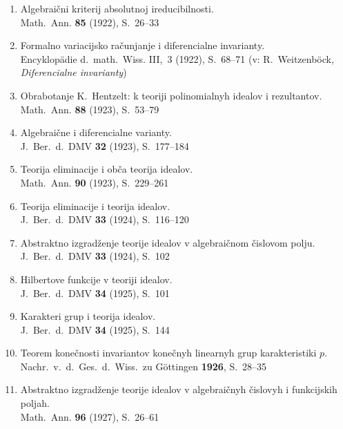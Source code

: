 \documentclass[11pt]{article}
\newcommand{\foreign}[1]{#1}
\begin{document}
\begin{enumerate}[label={\small\arabic*.},leftmargin=2em,itemsep=0.3em]
\item Algebraični kriterij absolutnoj ireducibilnosti.\\
\foreign{Math.\ Ann.} \textbf{85} (1922), S.~26--33

\item Formalno variacijsko računjanje i diferencialne invarianty.\\
\foreign{Encyklopädie d.\ math.\ Wiss.} III,\ 3 (1922), S.~68--71 (v:
R.\ Weitzenböck, \textit{Diferencialne invarianty})

\item Obrabotanje K.\ Hentzelt: k teoriji polinomialnyh idealov i rezultantov.\\
\foreign{Math.\ Ann.} \textbf{88} (1923), S.~53--79

\item Algebraične i diferencialne varianty.\\
\foreign{J.\ Ber.\ d.\ DMV} \textbf{32} (1923), S.~177--184

\item Teorija eliminacije i obča teorija idealov.\\
\foreign{Math.\ Ann.} \textbf{90} (1923), S.~229--261

\item Teorija eliminacije i teorija idealov.\\
\foreign{J.\ Ber.\ d.\ DMV} \textbf{33} (1924), S.~116--120

\item Abstraktno izgradženje teorije idealov v algebraičnom čislovom polju.\\
\foreign{J.\ Ber.\ d.\ DMV} \textbf{33} (1924), S.~102

\item Hilbertove funkcije v teoriji idealov.\\
\foreign{J.\ Ber.\ d.\ DMV} \textbf{34} (1925), S.~101

\item Karakteri grup i teorija idealov.\\
\foreign{J.\ Ber.\ d.\ DMV} \textbf{34} (1925), S.~144

\item Teorem konečnosti invariantov konečnyh linearnyh grup karakteristiki $p$.\\
\foreign{Nachr.\ v.\ d.\ Ges.\ d.\ Wiss.\ zu Göttingen} \textbf{1926}, S.~28--35

\item Abstraktno izgradženje teorije idealov v algebraičnyh čislovyh i funkcijskih poljah.\\
\foreign{Math.\ Ann.} \textbf{96} (1927), S.~26--61


\end{enumerate}
\end{document}
